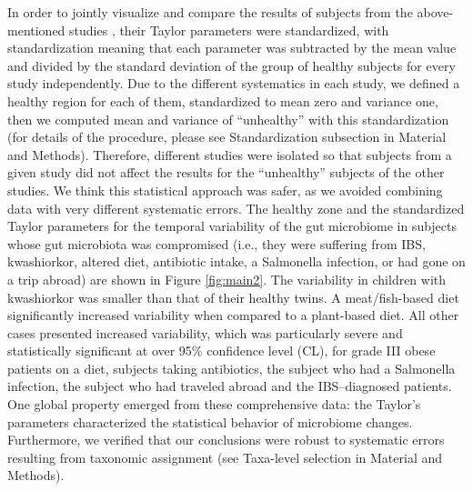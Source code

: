 In order to jointly visualize and compare the results of subjects from the above-mentioned studies \cite{IBS,moving,antibiotic,LEA,kwashiorkor,diet,hostlife}, their Taylor parameters were standardized, with standardization meaning that each parameter was subtracted by the mean value and divided by the standard deviation of the group of healthy subjects for every study independently. Due to the different systematics in each study, we defined a healthy region for each of them, standardized to mean zero and variance one, then we computed mean and variance of “unhealthy” with this standardization (for details of the procedure, please see Standardization subsection in Material and Methods). Therefore, different studies were isolated so that subjects from a given study did not affect the results for the “unhealthy” subjects of the other studies. We think this statistical approach was safer, as we avoided combining data with very different systematic errors. The healthy zone and the standardized Taylor parameters for the temporal variability of the gut microbiome in subjects whose gut microbiota was compromised (i.e., they were suffering from IBS, kwashiorkor, altered diet, antibiotic intake, a Salmonella infection, or had gone on a trip abroad) are shown in Figure \ref{fig:main2}. The variability in children with kwashiorkor was smaller than that of their healthy twins. A meat/fish-based diet significantly increased variability when compared to a plant-based diet. All other cases presented increased variability, which was particularly severe and statistically significant at over 95\% confidence level (CL), for grade III obese patients on a diet, subjects taking antibiotics, the subject who had a Salmonella infection, the subject who had traveled abroad and the IBS--diagnosed patients. One global property emerged from these comprehensive data: the Taylor’s parameters characterized the statistical behavior of microbiome changes. Furthermore, we verified that our conclusions were robust to systematic errors resulting from taxonomic assignment (see Taxa-level selection in Material and Methods).

